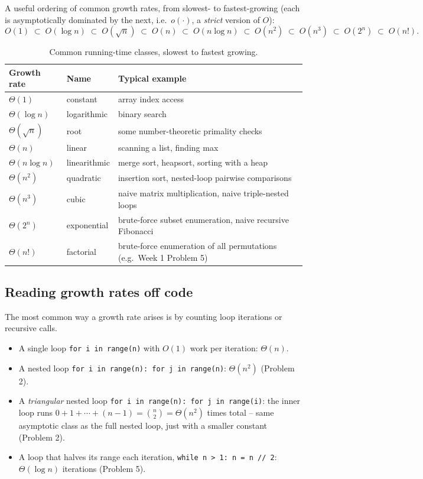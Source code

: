 \documentclass[11pt]{article}
\begin{document}
A useful ordering of common growth rates, from slowest- to fastest-growing (each is
asymptotically dominated by the next, i.e.\ $o(\cdot)$, a \emph{strict} version of $O$):
\[
  O(1) \;\subset\; O(\log n) \;\subset\; O(\sqrt{n}) \;\subset\; O(n) \;\subset\;
  O(n \log n) \;\subset\; O(n^2) \;\subset\; O(n^3) \;\subset\; O(2^n) \;\subset\; O(n!).
\]

\begin{table}[h]
\centering
\begin{tabular}{@{}llp{6.5cm}@{}}
\toprule
Growth rate & Name & Typical example \\
\midrule
$\Theta(1)$        & constant     & array index access \\
$\Theta(\log n)$   & logarithmic  & binary search \\
$\Theta(\sqrt{n})$ & root         & some number-theoretic primality checks \\
$\Theta(n)$        & linear       & scanning a list, finding max \\
$\Theta(n \log n)$ & linearithmic & merge sort, heapsort, sorting with a heap \\
$\Theta(n^2)$      & quadratic    & insertion sort, nested-loop pairwise comparisons \\
$\Theta(n^3)$      & cubic        & naive matrix multiplication, naive triple-nested loops \\
$\Theta(2^n)$      & exponential  & brute-force subset enumeration, naive recursive Fibonacci \\
$\Theta(n!)$       & factorial    & brute-force enumeration of all permutations (e.g.\ Week 1
                                     Problem 5) \\
\bottomrule
\end{tabular}
\caption{Common running-time classes, slowest to fastest growing.}
\end{table}

\subsection{Reading growth rates off code}

The most common way a growth rate arises is by counting loop iterations or recursive
calls.

\begin{itemize}
    \item A single loop \texttt{for i in range(n)} with $O(1)$ work per iteration:
    $\Theta(n)$.
    \item A nested loop \texttt{for i in range(n): for j in range(n)}: $\Theta(n^2)$
    (Problem 2).
    \item A \emph{triangular} nested loop \texttt{for i in range(n): for j in range(i)}:
    the inner loop runs $0 + 1 + \cdots + (n-1) = \binom{n}{2} = \Theta(n^2)$ times total --
    same asymptotic class as the full nested loop, just with a smaller constant
    (Problem 2).
    \item A loop that halves its range each iteration, \texttt{while n > 1: n = n // 2}:
    $\Theta(\log n)$ iterations (Problem 5).
\end{itemize}
\end{document}

